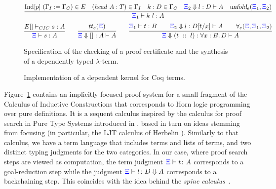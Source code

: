 \begin{figure}[t]
    \newcommand{\bc}[5]{#1#2\Downarrow #3 : #4 \vdash #5}
\[
\infer{\XXi_1\vdash k\ l : A}
      {\mathrm{Ind}[p] \ (\Gamma_I := \Gamma_C) \in E\quad (\mathit{head} \ A : T)\in \Gamma_I\quad  k : D \in \Gamma_C\quad \bc{\XXi_2}{} l D A \quad\unfoldExpert{\XXi_1}{\XXi_2}} 
\]
\vskip -18pt
\[
\infer{\XXi\vdash  s : A}
{%
  {E[] \vdash_{CIC} s : A}%
}
\qquad
  \infer{\bc {\XXi}{} {[]} A A}{\trueExpert{\XXi}}{}\qquad
  \infer{\bc{\XXi}{}{(t\ ::\ l)} {\forall x:B.\, D} A}
  {\XXi_1\vdash t : B\qquad \bc{\XXi_2}{}l {D[t/x]} A\qquad\prodExpert{\XXi}{\XXi_1}{\XXi_2}}{}
\]
%
\caption{Specification of the checking of a proof certificate and the
  synthesis of a dependently typed $\lambda$-term.}
\label{fig:augmented}
\end{figure}
\begin{figure}


\caption{Implementation of a  dependent kernel for Coq terms.}
\label{fig:kernel}
\end{figure}

Figure~\ref{fig:augmented} contains an implicitly focused proof system  for a small fragment of the Calculus of Inductive Constructions that corresponds to Horn logic programming over pure  definitions.
%
It is a sequent calculus inspired by the calculus for
proof search in Pure Type Systems introduced in \cite{LengrandDM06}, based in
 turn on ideas stemming from focusing (in particular, the LJT calculus of
Herbelin \cite{Herbelin94}). Similarly to that calculus, we have a term
language that includes terms and lists of terms, and two distinct typing
judgments for the two categories. In our case, where proof search steps are
viewed as computation, the term judgment ${\color{blue}{\Xi}}\vdash t \colon A$ corresponds to a goal-reduction
step while the judgment ${\color{blue}{\Xi}}\vdash l \colon D \Downarrow A$ corresponds to a backchaining step. This coincides
with the idea behind the \emph{spine calculus}~\cite{Cervesato97tr}.


